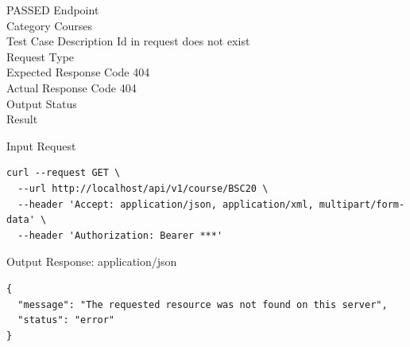 \begin{testcase}{63}{PASSED}
Endpoint \hfill {}\\
Category \hfill Courses\\
Test Case Description \hfill Id in request does not exist\\

Request Type    \hfill {}\\
Expected Response Code    \hfill 404\\
Actual Response Code    \hfill 404\\

Output Status \hfill {}\\
Result \hfill {}

\begin{ipblock}{Input Request}
\begin{verbatim}
curl --request GET \
  --url http://localhost/api/v1/course/BSC20 \
  --header 'Accept: application/json, application/xml, multipart/form-data' \
  --header 'Authorization: Bearer ***'
\end{verbatim}
\end{ipblock}

\begin{opblock}{Output Response: application/json}
\begin{verbatim}
{
  "message": "The requested resource was not found on this server",
  "status": "error"
}
\end{verbatim}
\end{opblock}
\end{testcase}

